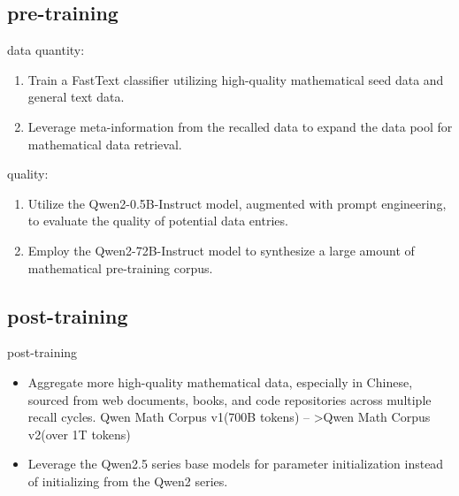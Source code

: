 \documentclass[aspectratio=169]{beamer}
\begin{document}
\subsection{pre-training}
\begin{frame}{data}
    quantity:
    \begin{enumerate}
    \item Train a FastText classifier utilizing high-quality mathematical seed data and general text data.
\pause
    \item Leverage meta-information from the recalled data to expand the data pool for mathematical data retrieval.
    \pause
    \end{enumerate}
quality: 
\begin{enumerate}
    \item Utilize the Qwen2-0.5B-Instruct model, augmented with prompt engineering, to evaluate the quality of potential data entries.
    \pause
    \item Employ the Qwen2-72B-Instruct model to synthesize a large amount of mathematical pre-training corpus.
\end{enumerate}
\end{frame}

\subsection{post-training}
\begin{frame}{post-training}
    \begin{itemize}
        \item Aggregate more high-quality mathematical data, especially in Chinese, sourced from web documents, books, and code repositories across multiple recall cycles. Qwen Math Corpus v1(700B tokens) -- >Qwen Math Corpus v2(over 1T tokens)\\[.2cm]
        \pause
        \item Leverage the Qwen2.5 series base models for parameter initialization instead of initializing from the Qwen2 series.
    \end{itemize}


\end{frame}
\end{document}
